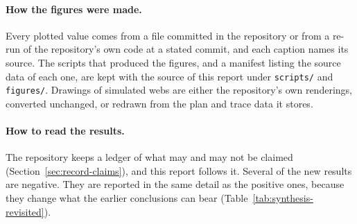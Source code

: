 \paragraph{How the figures were made.}
Every plotted value comes from a file committed in the repository or from a re-run of the repository's own
code at a stated commit, and each caption names its source. The scripts that produced the figures, and a
manifest listing the source data of each one, are kept with the source of this report under \texttt{scripts/} and
\texttt{figures/}. Drawings of simulated webs are either the repository's own renderings, converted
unchanged, or redrawn from the plan and trace data it stores.

\paragraph{How to read the results.}
The repository keeps a ledger of what may and may not be claimed (Section~\ref{sec:record-claims}), and this
report follows it. Several of the new results are negative. They are reported in the same detail as the
positive ones, because they change what the earlier conclusions can bear
(Table~\ref{tab:synthesis-revisited}).
